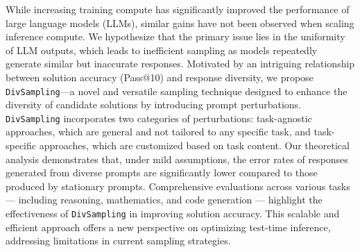 While increasing training compute has significantly improved the performance of large language models (LLMs), similar gains have not been observed when scaling inference compute. We hypothesize that the primary issue lies in the uniformity of LLM outputs, which leads to inefficient sampling as models repeatedly generate similar but inaccurate responses. Motivated by an intriguing relationship between solution accuracy (Pass@10) and response diversity, we propose \texttt{DivSampling}—a novel and versatile sampling technique designed to enhance the diversity of candidate solutions by introducing prompt perturbations.
\texttt{DivSampling} incorporates two categories of perturbations: task-agnostic approaches, which are general and not tailored to any specific task, and task-specific approaches, which are customized based on task content. Our theoretical analysis demonstrates that, under mild assumptions, the error rates of responses generated from diverse prompts are significantly lower compared to those produced by stationary prompts.
Comprehensive evaluations across various tasks — including reasoning, mathematics, and code generation — highlight the effectiveness of \texttt{DivSampling} in improving solution accuracy. This scalable and efficient approach offers a new perspective on optimizing test-time inference, addressing limitations in current sampling strategies.